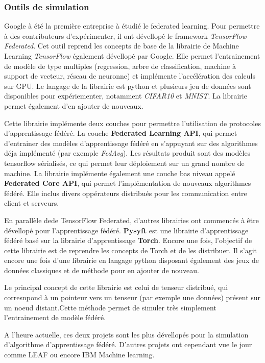\documentclass[stage3a]{tnreport} %
\begin{document}
\subsubsection{Outils de simulation}

Google à été la première entreprise à étudié le federated learning. Pour permettre à des contributeurs d'expérimenter, il ont dévellopé le framework \textit{TensorFlow Federated}. Cet outil reprend les concepts de base de la librairie de Machine Learning \textit{TensorFlow} également dévellopé par Google. Elle permet l'entrainement de modèle de type multiples (regression, arbre de classification, machine à support de vecteur, réseau de neuronne) et implémente l'accélération des calculs sur GPU. Le langage de la librairie est python et plusieurs jeu de données sont disponibles pour expériementer, notamment \textit{CIFAR10} et \textit{MNIST}. La librairie permet également d'en ajouter de nouveaux.

Cette librairie implémente deux couches pour permettre l'utilisation de protocoles d'apprentissage fédéré.  
La couche \textbf{Federated Learning API}, qui permet d'entrainer des modèles d'apprentissage fédéré en s'appuyant sur des algorithmes déja implémenté (par exemple \textit{FedAvg}). Les résultats produit sont des modèles tensorflow sérialisés, ce qui permet leur déploiement sur un grand nombre de machine.
La librairie implémente également une couche bas niveau appelé \textbf{Federated Core API}, qui permet l'implémentation de nouveaux algorithmes fédéré. Elle inclus divers oppérateurs distribués pour les communication entre client et serveurs.

En parallèle dede TensorFlow Federated, d'autres librairies ont commencés à être dévellopé pour l'apprentissage fédéré. \textbf{Pysyft} est une librairie d'apprentissage fédéré basé sur la librairie d'apprentissage \textbf{Torch}. Encore une fois, l'objectif de cette librairie est de reprendre les concepts de Torch et de les distribuer. Il s'agit encore une fois d'une librairie en langage python disposant également des jeux de données classiques et de méthode pour en ajouter de nouveau.

Le principal concept de cette librairie est celui de tenseur distribué, qui corresnpond à un pointeur vers un tenseur (par exemple une données) présent sur un noeud distant.Cette méthode permet de simuler très simplement l'entrainement de modèle 
fédéré. 

A l'heure actuelle, ces deux projets sont les plus dévellopés pour la simulation d'algorithme d'apprentissage fédéré. D'autres projets ont cependant vue le jour comme LEAF ou encore IBM Machine learning.
\end{document}
